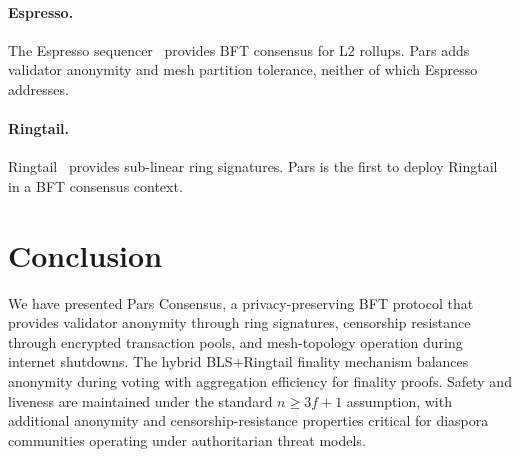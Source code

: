 \documentclass[11pt,a4paper]{article}
\begin{document}
\paragraph{Espresso.}  The Espresso sequencer~\cite{espresso2023} provides
BFT consensus for L2 rollups.  Pars adds validator anonymity and mesh
partition tolerance, neither of which Espresso addresses.

\paragraph{Ringtail.}  Ringtail~\cite{ringtail2023} provides sub-linear
ring signatures.  Pars is the first to deploy Ringtail in a BFT consensus
context.

\section{Conclusion}
\label{sec:conclusion}

We have presented Pars Consensus, a privacy-preserving BFT protocol that
provides validator anonymity through ring signatures, censorship
resistance through encrypted transaction pools, and mesh-topology
operation during internet shutdowns.  The hybrid BLS+Ringtail finality
mechanism balances anonymity during voting with aggregation efficiency
for finality proofs.  Safety and liveness are maintained under the
standard $n \geq 3f + 1$ assumption, with additional anonymity and
censorship-resistance properties critical for diaspora communities
operating under authoritarian threat models.
\end{document}

